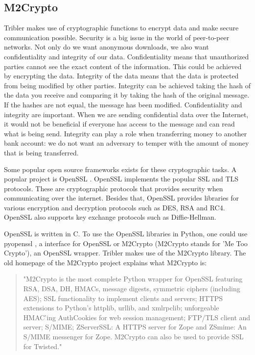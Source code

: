 	\subsection{M2Crypto}
		Tribler makes use of cryptographic functions to encrypt data and make secure communication possible. Security is a big issue in the world of peer-to-peer networks. Not only do we want anonymous downloads, we also want confidentiality and integrity of our data. Confidentiality means that unauthorized parties cannot see the exact content of the information. This could be achieved by encrypting the data. Integrity of the data means that the data is protected from being modified by other parties. Integrity can be achieved taking the hash of the data you receive and comparing it by taking the hash of the original message. If the hashes are not equal, the message has been modified. Confidentiality and integrity are important. When we are sending confidential data over the Internet, it would not be beneficial if everyone has access to the message and can read what is being send. Integrity can play a role when transferring money to another bank account: we do not want an adversary to temper with the amount of money that is being transferred.
		
		Some popular open source frameworks exists for these cryptographic tasks. A popular project is OpenSSL \cite{openssl}. OpenSSL implements the popular SSL and TLS protocols. These are cryptographic protocols that provides security when communicating over the internet. Besides that, OpenSSL provides libraries for various encryption and decryption protocols such as DES, RSA and RC4. OpenSSL also supports key exchange protocols such as Diffie-Hellman.
		
		OpenSSL is written in C. To use the OpenSSL libraries in Python, one could use pyopenssl \cite{pyopensslgithub}, a interface for OpenSSL or M2Crypto \cite{m2cryptogithub} (M2Crypto stands for 'Me Too Crypto'), an OpenSSL wrapper. Tribler makes use of the M2Crypto library. The old homepage of the M2Crypto project explains what M2Crypto is:
		
		\begin{quote}
		"M2Crypto is the most complete Python wrapper for OpenSSL featuring RSA, DSA, DH, HMACs, message digests, symmetric ciphers (including AES); SSL functionality to implement clients and servers; HTTPS extensions to Python's httplib, urllib, and xmlrpclib; unforgeable HMAC'ing AuthCookies for web session management; FTP/TLS client and server; S/MIME; ZServerSSL: A HTTPS server for Zope and ZSmime: An S/MIME messenger for Zope. M2Crypto can also be used to provide SSL for Twisted." \cite{m2crypto}
		\end{quote}
		
